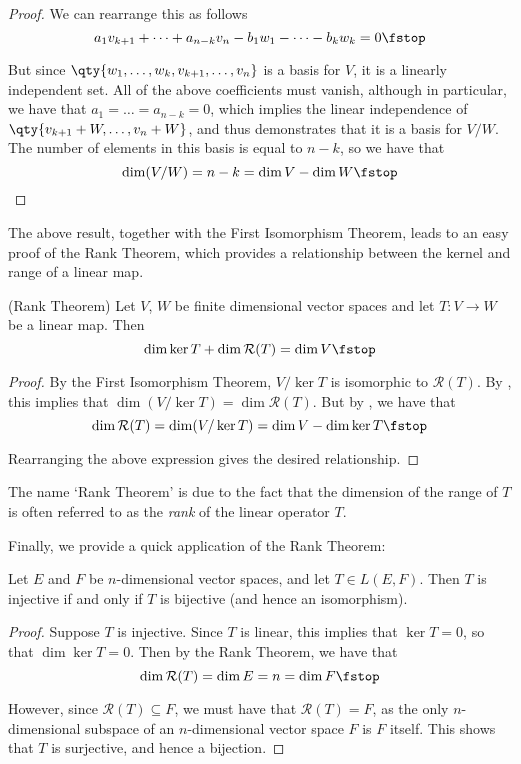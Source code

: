 \begin{proof}
   We can rearrange this as follows
   \[ a_1v_{k+1}+\dots+a_{n-k}v_n-b_1w_1-\dots-b_kw_k=0\fstop \]

   But since \( \qty{w_1,\dots,w_k,v_{k+1},\dots,v_n} \) is a basis for \( V \), it is a linearly independent set. All of the above coefficients must vanish, although in particular, we have that \( a_1=\dots=a_{n-k}=0 \), which implies the linear independence of \( \qty{v_{k+1}+W,\dots,v_n+W} \), and thus demonstrates that it is a basis for \( V/W \). The number of elements in this basis is equal to \( n-k \), so we have that
   \[ \dim(V/W)=n-k=\dim V-\dim W\fstop \]
 \end{proof}

 The above result, together with the First Isomorphism Theorem, leads to an easy proof of the Rank Theorem, which provides a relationship between the kernel and range of a linear map.
 
 \begin{theorem}
   (Rank Theorem) Let \( V \), \( W \) be finite dimensional vector spaces and let \( T:V\to W \) be a linear map. Then
   \[ \dim\ker T+\dim\mathcal{R}(T)=\dim V\fstop \]
 \end{theorem}
 \begin{proof}
   By the First Isomorphism Theorem, \( V/\ker T \) is isomorphic to \( \mathcal{R}(T) \). By , this implies that \( \dim (V/\ker T)=\dim\mathcal{R}(T) \). But by , we have that
   \[ \dim\mathcal{R}(T)=\dim (V/\ker T)=\dim V-\dim\ker T\fstop \]

   Rearranging the above expression gives the desired relationship.
 \end{proof}

 The name `Rank Theorem' is due to the fact that the dimension of the range of \( T \) is often referred to as the \emph{rank} of the linear operator \( T \).

 \vspace{3mm}
 
 Finally, we provide a quick application of the Rank Theorem:
 \begin{proposition}
   Let \( E \) and \( F \) be \( n \)-dimensional vector spaces, and let \( T\in L(E,F) \). Then \( T \) is injective if and only if \( T \) is bijective (and hence an isomorphism).
 \end{proposition}
 \begin{proof}
   Suppose \( T \) is injective. Since \( T \) is linear, this implies that \( \ker T=\qty{0} \), so that \( \dim\ker T=0 \). Then by the Rank Theorem, we have that
   \[ \dim\mathcal{R}(T)=\dim E=n=\dim F\fstop \]

   However, since \( \mathcal{R}(T)\subseteq F \), we must have that \( \mathcal{R}(T)=F \), as the only \( n \)-dimensional subspace of an \( n \)-dimensional vector space \( F \) is \( F \) itself. This shows that \( T \) is surjective, and hence a bijection.
 \end{proof}

